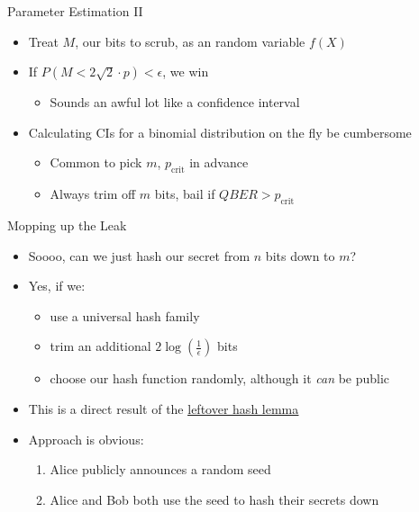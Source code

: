\documentclass[pdf]{beamer}
\begin{document}
\begin{frame}{Parameter Estimation II}
  \begin{itemize}
  \item Treat $M$, our bits to scrub, as an random variable $f(X)$
  \item If $P(M < 2\sqrt{2} \cdot p) < \epsilon$, we win
    \begin{itemize}
    \item Sounds an awful lot like a confidence interval
    \end{itemize}
  \item Calculating CIs for a binomial distribution on the fly be cumbersome
    \begin{itemize}
    \item Common to pick $m$, $p_\text{crit}$ in advance
    \item Always trim off $m$ bits, bail if $QBER > p_\text{crit}$
    \end{itemize}
  \end{itemize}
\end{frame}
\begin{frame}{Mopping up the Leak}
  \begin{itemize}
  \item Soooo, can we just hash our secret from $n$ bits down to $m$?
  \item Yes, if we:
    \begin{itemize}
    \item use a universal hash family
    \item trim an additional $2 \log \left( \frac{1}{\epsilon} \right)$ bits
    \item choose our hash function randomly, although it \emph{can} be public
    \end{itemize}
  \item This is a direct result of the
    \underline{\href{https://www.cs.bu.edu/~reyzin/teaching/s11cs937/notes-leo-1.pdf}{leftover
        hash lemma}}
  \item Approach is obvious:
    \begin{enumerate}
    \item Alice publicly announces a random seed
    \item Alice and Bob both use the seed to hash their secrets down
    \end{enumerate}
  \end{itemize}
\end{frame}
\end{document}
